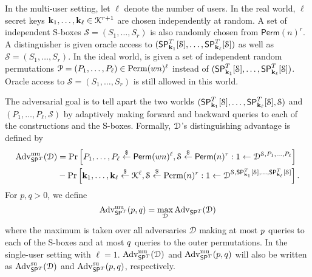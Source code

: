 In the multi-user setting, let $\ell$ denote the number of users. In the real
world, $\ell$ secret keys $\mathbf{k}_1,\ldots,\mathbf{k}_\ell\in\mathcal{K}^{r+1}$ are chosen independently at random.
A set of independent S-boxes $\mathcal{S}=(S_1,\ldots,S_r)$ is also randomly chosen from $\textsf{Perm}(n)^r$. A distinguisher \dis is given oracle access to $(\mathsf{SP}_{\mathbf{k}_1}^T[\mathcal{S}],\ldots,\mathsf{SP}_{\mathbf{k}_\ell}^T[\mathcal{S}])$ as
well as $\mathcal{S}=(S_1,\ldots,S_r)$. In the ideal world, \dis is given a set of independent
random permutations ${\mathcal{P}}=({P}_1,\ldots,{P}_{\ell})\in{\operatorname{Perm}}(wn)^\ell$ instead of $(\mathsf{SP}_{\mathbf{k}_1}^T[\mathcal{S}],\ldots,\mathsf{SP}_{\mathbf{k}_\ell}^T[\mathcal{S}])$. Oracle access to $\mathcal{S}=(S_1,\ldots,S_r)$ is still allowed in this world.


The adversarial goal is to tell apart the two worlds $(\mathsf{SP}_{\mathbf{k}_1}^T[\mathcal{S}],\ldots,\mathsf{SP}_{\mathbf{k}_\ell}^T[\mathcal{S}],\mathcal{S})$ and $({P}_1,\ldots,{P}_{\ell},\mathcal{S})$ by adaptively making forward and backward queries to each
of the constructions and the S-boxes. Formally, $\mathcal{D}$'s distinguishing advantage is
defined by
%
$$
\begin{aligned}
\operatorname{Adv}_{\mathsf{SP}^T}^{\mathrm{mu}}(\mathcal{D}) &=\operatorname{Pr}\left[{P}_1,\ldots,{P}_{\ell} \stackrel{\$}{\leftarrow} {\mathsf{Perm}}(w n)^\ell, \mathcal{S} \stackrel{\$}{\leftarrow} \mathsf{Perm}(n)^{r}: 1 \leftarrow \mathcal{D}^{\mathcal{S}, {P}_{1}, \ldots, {P}_{\ell}}\right] \\
&-\operatorname{Pr}\left[\mathbf{k}_{1}, \ldots, \mathbf{k}_{\ell} \stackrel{\$}{\leftarrow} \mathcal{K}^{\ell}, \mathcal{S} \stackrel{\$}{\leftarrow} \operatorname{Perm}(n)^{r}: 1 \leftarrow \mathcal{D}^{\mathcal{S}, \mathsf{SP}_{\mathbf{k}_{1}}^T[\mathcal{S}], \ldots, \mathsf{SP}_{\mathbf{k}_{\ell}}^T[\mathcal{S}]}\right].
\end{aligned}
$$
%
For $p,q > 0$, we define
%
$$
\operatorname{Adv}^{\mathrm{mu}}_{\mathsf{SP}^T}(p, q) = \max _{\mathcal{D}} \operatorname{Adv}_{\mathsf{SP}^T}(\mathcal{D})
$$
%
where the maximum is taken over all adversaries $\mathcal{D}$ making at most $\mathnormal{p}$ queries to each of the S-boxes and at most $\mathnormal{q}$ queries to the outer permutations. In the single-user setting with $\ell = 1$. $\operatorname{Adv}^{\mathrm{mu}}_{\mathsf{SP}^T}(\mathcal{D})$ and $\operatorname{Adv}^{\mathrm{mu}}_{\mathsf{SP}^T}(p, q)$  will also be written as $\operatorname{Adv}^{\mathrm{su}}_{\mathsf{SP}^T}(\mathcal{D})$ and $\operatorname{Adv}^{\mathrm{su}}_{\mathsf{SP}^T}(p, q)$, respectively.





